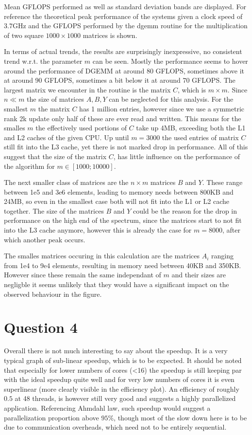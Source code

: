 \documentclass{scrartcl}
\begin{document}
Mean GFLOPS performed as well as standard deviation bands are displayed. 
For reference the theoretical peak performance of the systems given a clock speed of $3.7$GHz and the GFLOPS performed by the dgemm routine for the multiplication of two square $1000 \times 1000$ matrices is shown.

In terms of actual trends, the results are surprisingly inexpressive, no consistent trend w.r.t. the parameter $m$ can be seen.
Mostly the performance seems to hover around the performance of DGEMM at around 80 GFLOPS, sometimes above it at around 90 GFLOPS, sometimes a bit below it at around 70 GFLOPS.
The largest matrix we encounter in the routine is the matrix $C$, which is $m \times m$.
Since $n \ll m$ the size of matrices $A,B,Y$ can be neglected for this analysis.
For the smallest $m$ the matrix $C$ has 1 million entries, however since we use a symmetric rank 2k update only half of these are ever read and written.
This means for the smalles $m$ the effectively used portions of $C$ take up 4MB, exceeding both the L1 and L2 caches of the given CPU.
Up until $m=3000$ the used entries of matrix $C$ still fit into the L3 cache, yet there is not marked drop in performance.
All of this suggest that the size of the matrix $C$, has little influence on the performance of the algorithm for $m \in [1000;10000]$.

The next smaller class of matrices are the $n \times m$ matrices $B$ and $Y$.
These range between 1e5 and 3e6 elements, leading to memory needs between 800KB and 24MB, so even in the smallest case both will not fit into the L1 or L2 cache together.
The size of the matrices $B$ and $Y$ could be the reason for the drop in performance on the high end of the spectrum, since the matrices start to not fit into the L3 cache anymore, however this is already the case for $m=8000$, after which another peak occurs.

The smalles matrices occuring in this calculation are the matrices $A_i$ ranging from 1e4 to 9e4 elements, resulting in memory need between 40KB and 350KB.
However since these remain the same independant of $m$ and their sizes are negligble it seems unlikely that they would have a significant impact on the observed behaviour in the figure.

\section{Question 4}

Overall there is not much interesting to say about the speedup. 
It is a very typical graph of sub-linear speedup, which is to be expected.
It should be noted that especially for lower numbers of cores (<16) the speedup is still keeping par with the ideal speedup quite well and for very low numbers of cores it is even superlinear (more clearly visible in the efficiency plot).
An efficiency of roughly $0.5$ at 48 threads, is however still very good and suggests a highly parallelized application.
Referencing Ahmdahl law, such speedup would suggest a parallelization proportion above $95\%$, though most of the slow down here is to be due to communication overheads, which need not to be entirely sequential.
\end{document}
